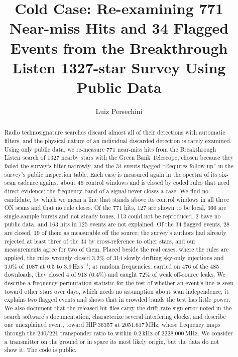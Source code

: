 \documentclass[twocolumn]{aastex631}
\newcommand{\hzs}{Hz\,s$^{-1}$}
\begin{document}
\title{Cold Case: Re-examining 771 Near-miss Hits and 34 Flagged Events from the Breakthrough Listen 1327-star Survey Using Public Data}

\author{Luiz Persechini}

\begin{abstract}
Radio technosignature searches discard almost all of their detections with
automatic filters, and the physical nature of an individual discarded
detection is rarely examined. Using only public data, we re-measure 771
near-miss hits from the Breakthrough Listen search of 1327 nearby stars with
the Green Bank Telescope, chosen because they failed the survey's filter
narrowly, and the 34 events flagged ``Requires follow up'' in the survey's
public inspection table. Each case is measured again in the spectra of its
six-scan cadence against about 46 control windows and is closed by coded
rules that need direct evidence; the frequency band of a signal never closes
a case. We find no candidate, by which we mean a line that stands above its
control windows in all three ON scans and that no rule closes. Of the 771
hits, 127 are shown to be local, 366 are single-sample bursts and not steady
tones, 113 could not be reproduced, 2 have no public data, and 163 hits in
125 events are not explained. Of the 34 flagged events, 28 are closed, 19
of them as measurable off the source; the survey's authors had already
rejected at least three of the 34 by cross-reference to other stars, and our
measurements agree for two of them. Placed beside the real cases, where the rules are
applied, the rules wrongly closed 3.2\% of 314 slowly drifting sky-only
injections and 3.0\% of 1087 at 0.5 to 3.9\,\hzs; at random frequencies,
carried on 476 of the 485 downloads, they closed 4 of 918 (0.4\%) and caught
72\% of weak off-source leaks. We describe a frequency-permutation statistic for
the test of whether an event's line is seen toward other stars over days,
which needs no assumption about scan independence; it explains two flagged
events and shows that in crowded bands the test has little power. We also
document that the released hit files carry the drift-rate sign error noted
in the search software's documentation, characterize several interfering
clocks, and describe one unexplained event, toward HIP\,36357 at
2051.617\,MHz, whose frequency maps through the 240/221 transponder ratio to
within 0.2\,kHz of 2228.000\,MHz. We consider a transmitter on the ground
or in space its most likely origin, but the data do not show it. The code
is public.
\end{abstract}
\end{document}

